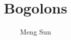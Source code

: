 \documentclass{tufte-book}
\title{Bogolons}
\author{Meng Sun}
\begin{document}
\maketitle
\tableofcontents





{}

\end{document}
